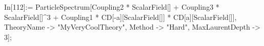 In[112]:= ParticleSpectrum[Coupling2 * ScalarField[] + Coupling3 * ScalarField[]^3 + Coupling1 * CD[-a][ScalarField[]] * CD[a][ScalarField[]], TheoryName -> "MyVeryCoolTheory", Method -> "Hard", MaxLaurentDepth -> 3]; 